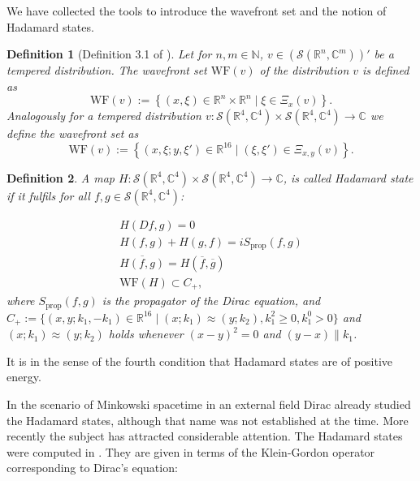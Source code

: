 \documentclass[b5paper,draft,openbib,12pt]{memoir}
\newtheorem{Def}{Definition}
\begin{document}
We have collected the tools to introduce the wavefront set and the notion of Hadamard states.

\begin{Def}[Definition 3.1 of \cite{zahn2014renormalized}]
Let for \(n,m\in\mathbb{N}\), \(v\in (\mathcal{S}(\mathbb{R}^n,\mathbb{C}^m))'\) be a tempered distribution. The wavefront set \(\mathrm{WF}(v)\) of 
the distribution \(v\) is defined as 
\begin{equation}
\mathrm{WF}(v):= \left\{(x,\xi)\in \mathbb{R}^n\times \mathbb{R}^n\mid \xi \in \Xi_x(v) \right\}.
\end{equation}
Analogously for a tempered distribution 
\(v:\mathcal{S}(\mathbb{R}^4,\mathbb{C}^4)\times \mathcal{S}(\mathbb{R}^4,\mathbb{C}^4)\rightarrow \mathbb{C}\)
we define the wavefront set as
\begin{equation}
  \mathrm{WF}(v):= \left\{(x,\xi;y,\xi')\in \mathbb{R}^{16}\mid (\xi,\xi') \in \Xi_{x,y}(v) \right\}.
\end{equation}
\end{Def}

\begin{Def}\label{def: hadamard}
A map \(H: \mathcal{S}(\mathbb{R}^4,\mathbb{C}^4)\times \mathcal{S}(\mathbb{R}^4,\mathbb{C}^4) \rightarrow \mathbb{C}\), is called Hadamard state if it fulfils
for all \( f,g\in \mathcal{S}(\mathbb{R}^4,\mathbb{C}^4)\):

\begin{align}
H(Df,g)=0\\
H(f,g)+H(g,f)=i S_{\text{prop}}(f,g)\\
\overline{H(f,g)}=H(\overline{f},\overline{g})\\
\text{WF}(H)\subset C_+,
\end{align}
where \(S_{\text{prop}}(f,g)\) is the propagator of the Dirac equation, 
  and  \(C_+:=\{(x,y;k_1,-k_1)\in\mathbb{R}^{16}\mid (x;k_1)\approx (y;k_2) , k_1^2\ge0, k_1^0>0\}\)
and \((x;k_1)\approx(y;k_2)\) holds whenever \((x-y)^2=0\) and \((y-x)\parallel k_1\).
\end{Def}
It is in the sense of the fourth condition that Hadamard states are of positive energy.

In the scenario of Minkowski spacetime in an external field Dirac \cite{Dirac34} already studied the Hadamard states, although that name was not established at the time.
More recently the subject has attracted considerable attention. 
The Hadamard states were computed in \cite{zahn2014renormalized, schlemmer2015current}. 
They are given in terms of the Klein-Gordon operator corresponding to Dirac's equation:
\end{document}
